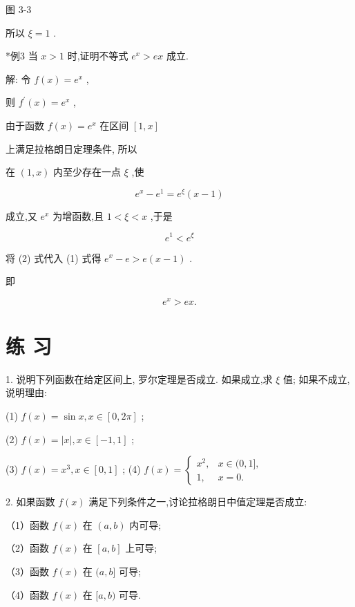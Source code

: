 \documentclass[10pt]{article}
\begin{document}
图 3-3

所以 \(\xi = 1\) .

*例3 当 \(x > 1\) 时,证明不等式 \({e}^{x} > {ex}\) 成立.

解: 令 \(f\left( x\right) = {e}^{x}\) ,

则 \({f}^{\prime }\left( x\right) = {e}^{x}\) ,

由于函数 \(f\left( x\right) = {e}^{x}\) 在区间 \(\left\lbrack {1,x}\right\rbrack\)

上满足拉格朗日定理条件, 所以

在 \(\left( {1,x}\right)\) 内至少存在一点 \(\xi\) ,使

\[
{e}^{x} - {e}^{1} = {e}^{\xi }\left( {x - 1}\right) \tag{1}
\]

成立,又 \({e}^{x}\) 为增函数,且 \(1 < \xi < x\) ,于是

\[
{e}^{1} < {e}^{\xi } \tag{2}
\]

将 (2) 式代入 (1) 式得 \({e}^{x} - e > e\left( {x - 1}\right)\) .

即

\[
{e}^{x} > {ex}\text{.}
\]

\section*{练 习}

1. 说明下列函数在给定区间上, 罗尔定理是否成立. 如果成立,求 \(\xi\) 值; 如果不成立,说明理由:

(1) \(f\left( x\right) = \sin x,x \in \left\lbrack {0,{2\pi }}\right\rbrack\) ;

(2) \(f\left( x\right) = \left| x\right| ,x \in \left\lbrack {-1,1}\right\rbrack\) ;

(3) \(f\left( x\right) = {x}^{3},x \in \left\lbrack {0,1}\right\rbrack\) ; (4) \(f\left( x\right) = \left\{ \begin{array}{ll} {x}^{2}, & x \in (0,1\rbrack , \\ 1, & x = 0. \end{array}\right.\)

2. 如果函数 \(f\left( x\right)\) 满足下列条件之一,讨论拉格朗日中值定理是否成立:

（1）函数 \(f\left( x\right)\) 在 \(\left( {a,b}\right)\) 内可导;

（2）函数 \(f\left( x\right)\) 在 \(\left\lbrack {a,b}\right\rbrack\) 上可导;

（3）函数 \(f\left( x\right)\) 在 \((a,b\rbrack\) 可导;

（4）函数 \(f\left( x\right)\) 在 \(\lbrack a,b)\) 可导.
\end{document}
